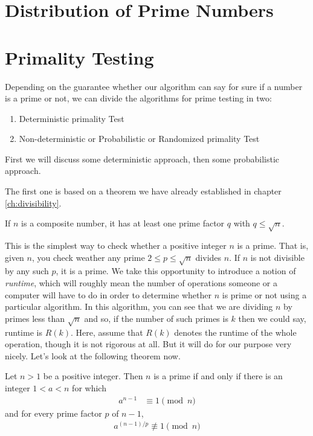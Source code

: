 \documentclass{subfiles}
\begin{document}
\section{Distribution of Prime Numbers}
	


\section{Primality Testing}\label{sec:primalitytesting}
	Depending on the guarantee whether our algorithm can say for sure if a number is a prime or not, we can divide the algorithms for prime testing in two:
		\begin{enumerate}
			\item Deterministic primality Test
			\item Non-deterministic or Probabilistic or Randomized primality Test
		\end{enumerate}
	First we will discuss some deterministic approach, then some probabilistic approach.

	The first one is based on a theorem we have already established in chapter \eqref{ch:divisibility}.
		\begin{theorem} \label{thm:trialdivision}
			If $n$ is a composite number, it has at least one prime factor $q$ with $q\leq\sqrt{n}$.
		\end{theorem}
	This is the simplest way to check whether a positive integer $n$ is a prime. That is, given $n$, you check weather any prime $2 \leq p \leq \sqrt n$ divides $n$. If $n$ is not divisible by any such $p$, it is a prime. We take this opportunity to introduce a notion of \textit{runtime}, which will roughly mean the number of operations someone or a computer will have to do in order to determine whether $n$ is prime or not using a particular algorithm. In this algorithm, you can see that we are dividing $n$ by primes less than $\sqrt{n}$ and so, if the number of such primes is $k$ then we could say, runtime is $R(k)$. Here, assume that $R(k)$ denotes the runtime of the whole operation, though it is not rigorous at all. But it will do for our purpose very nicely. Let's look at the following theorem now.
		\begin{theorem}
			\label{thm:lucastest}
			Let $n >1$ be a positive integer. Then $n$ is a prime if and only if there is an integer $1<a<n$ for which
				\begin{align*}
					a^{n-1} &\equiv1\pmod n
				\end{align*}
			and for every prime factor $p$ of $n-1$,
				\begin{align*}
					a^{(n-1)/p} \not \equiv 1 \pmod n
				\end{align*}
		\end{theorem}
\end{document}
